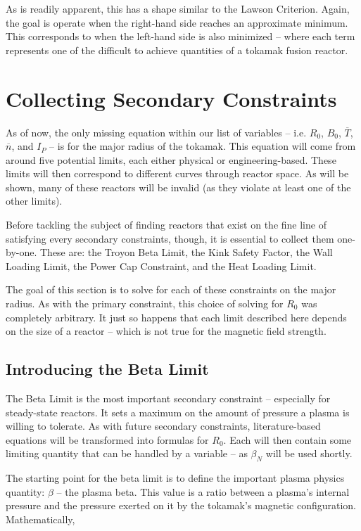 As is readily apparent, this has a shape similar to the Lawson Criterion. Again, the goal is operate when the right-hand side reaches an approximate minimum. This corresponds to when the left-hand side is also minimized -- where each term represents one of the difficult to achieve quantities of a tokamak fusion reactor.

\section{Collecting Secondary Constraints}

As of now, the only missing equation within our list of  variables -- i.e. $R_0$, $B_0$, $\overline T$, $\overline n$, and $I_P$ -- is for the major radius of the tokamak. This equation will come from around five potential limits, each either physical or engineering-based. These limits will then correspond to different curves through reactor space. As will be shown, many of these reactors will be invalid (as they violate at least one of the other limits).

Before tackling the subject of finding reactors that exist on the fine line of satisfying every secondary constraints, though, it is essential to collect them one-by-one. These are: the Troyon Beta Limit, the Kink Safety Factor, the Wall Loading Limit, the Power Cap Constraint, and the Heat Loading Limit. 

The goal of this section is to solve for each of these constraints on the major radius. As with the primary constraint, this choice of solving for $R_0$ was completely arbitrary. It just so happens that each limit described here depends on the size of a reactor -- which is not true for the magnetic field strength.

\subsection{Introducing the Beta Limit}

The Beta Limit is the most important secondary constraint -- especially for steady-state reactors. It sets a maximum on the amount of pressure a plasma is willing to tolerate. As with future secondary constraints, literature-based equations will be transformed into formulas for $R_0$. Each will then contain some limiting quantity that can be handled by a  variable -- as $\beta_N$ will be used shortly.

The starting point for the beta limit is to define the important plasma physics quantity: $\beta$ -- the plasma beta. This value is a ratio between a plasma's internal pressure and the pressure exerted on it by the tokamak's magnetic configuration. Mathematically, \cite{jeff}

